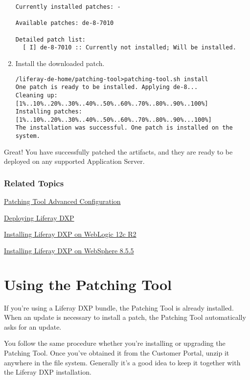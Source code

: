 \begin{enumerate}
\begin{verbatim}
Currently installed patches: -

Available patches: de-8-7010

Detailed patch list:
  [ I] de-8-7010 :: Currently not installed; Will be installed.
\end{verbatim}
\item
  Install the downloaded patch.

\begin{verbatim}
/liferay-de-home/patching-tool>patching-tool.sh install
One patch is ready to be installed. Applying de-8...
Cleaning up: [1%..10%..20%..30%..40%..50%..60%..70%..80%..90%..100%]
Installing patches: [1%..10%..20%..30%..40%..50%..60%..70%..80%..90%...100%]
The installation was successful. One patch is installed on the system.
\end{verbatim}
\end{enumerate}

Great! You have successfully patched the artifacts, and they are ready
to be deployed on any supported Application Server.

\subsection{Related Topics}\label{related-topics-9}

\href{/docs/7-0/deploy/-/knowledge_base/d/patching-tool-advanced-configuration}{Patching
Tool Advanced Configuration}

\href{https://help.liferay.com/hc/en-us/articles/360017895792-Introduction-to-Deploying-Liferay-DXP}{Deploying
Liferay DXP}

\href{/docs/7-0/deploy/-/knowledge_base/d/installing-liferay-dxp-on-weblogic-12c-r2}{Installing
Liferay DXP on WebLogic 12c R2}

\href{/docs/7-0/deploy/-/knowledge_base/d/installing-liferay-dxp-on-websphere-8-5-5}{Installing
Liferay DXP on WebSphere 8.5.5}

\chapter{Using the Patching Tool}\label{using-the-patching-tool}

If you're using a Liferay DXP bundle, the Patching Tool is already
installed. When an update is necessary to install a patch, the Patching
Tool automatically asks for an update.

You follow the same procedure whether you're installing or upgrading the
Patching Tool. Once you've obtained it from the Customer Portal, unzip
it anywhere in the file system. Generally it's a good idea to keep it
together with the Liferay DXP installation.

